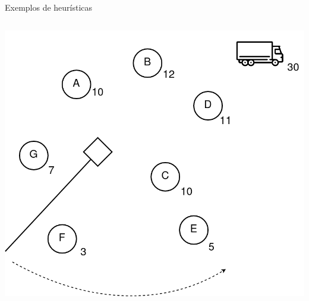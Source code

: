 \documentclass{beamer}
\begin{document}
\begin{frame}{Exemplos de heurísticas}
\begin{columns}
\begin{column}{.5\textwidth}
\begin{center}
    \includegraphics[scale=0.18]{assets/Roteirizacao/Varredura.drawio.png}
    \end{center}
    \end{column}
\end{columns}
    
\end{frame}


\end{document}
